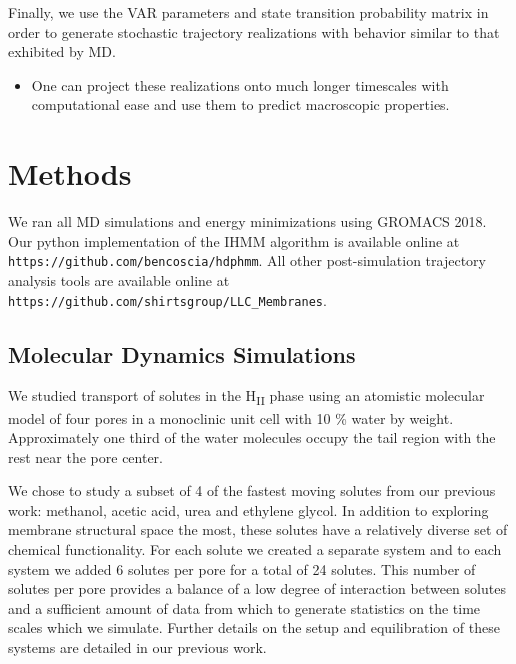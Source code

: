 \documentclass[journal=jpcbfk,manuscript=article]{achemso}
\begin{document}
  Finally, we use the VAR parameters and state transition probability matrix in
  order to generate stochastic trajectory realizations with behavior similar to that
  exhibited by MD. 
  \begin{itemize}  
    \item One can project these realizations onto much longer timescales with 
    computational ease and use them to predict macroscopic properties.
  \end{itemize}
     
  \section{Methods}
    
  We ran all MD simulations and energy minimizations using GROMACS 2018.
  ~\cite{bekker_gromacs:_1993,berendsen_gromacs:_1995,van_der_spoel_gromacs:_2005,hess_gromacs_2008}  
  Our python implementation of the IHMM algorithm is available online at \\
  \texttt{https://github.com/bencoscia/hdphmm}. All other post-simulation 
  trajectory analysis tools are available online at
  \texttt{https://github.com/shirtsgroup/LLC\_Membranes}.

  \subsection{Molecular Dynamics Simulations}

  We studied transport of solutes in the H\textsubscript{II} phase using an
  atomistic molecular model of four pores in a monoclinic unit cell with 
  10 \% water by weight. Approximately one third of the water molecules 
  occupy the tail region with the rest near the pore center.
  
  We chose to study a subset of 4 of the fastest moving solutes from our previous
  work: methanol, acetic acid, urea and ethylene glycol.
  In addition to exploring membrane structural space the most, these solutes have a
  relatively diverse set of chemical functionality. For each solute we created a 
  separate system and to 
  each system we added 6 solutes per pore for a total of 24 solutes. This number 
  of solutes per pore provides a balance of a low degree of interaction between 
  solutes and a sufficient amount of data from which to generate statistics on the
  time scales which we simulate. Further details on the setup and equilibration of
  these systems are detailed in our previous work.\cite{coscia_chemically_2019}
  
\end{document}
